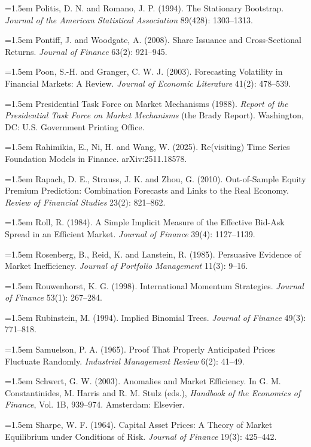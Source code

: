 \hangindent=1.5em Politis, D. N. and Romano, J. P. (1994). The Stationary Bootstrap. \emph{Journal of the American Statistical Association} 89(428): 1303--1313.

\hangindent=1.5em Pontiff, J. and Woodgate, A. (2008). Share Issuance and Cross-Sectional Returns. \emph{Journal of Finance} 63(2): 921--945.

\hangindent=1.5em Poon, S.-H. and Granger, C. W. J. (2003). Forecasting Volatility in Financial Markets: A Review. \emph{Journal of Economic Literature} 41(2): 478--539.

\hangindent=1.5em Presidential Task Force on Market Mechanisms (1988). \emph{Report of the Presidential Task Force on Market Mechanisms} (the Brady Report). Washington, DC: U.S. Government Printing Office.

\hangindent=1.5em Rahimikia, E., Ni, H. and Wang, W. (2025). Re(visiting) Time Series Foundation Models in Finance. arXiv:2511.18578.

\hangindent=1.5em Rapach, D. E., Strauss, J. K. and Zhou, G. (2010). Out-of-Sample Equity Premium Prediction: Combination Forecasts and Links to the Real Economy. \emph{Review of Financial Studies} 23(2): 821--862.

\hangindent=1.5em Roll, R. (1984). A Simple Implicit Measure of the Effective Bid-Ask Spread in an Efficient Market. \emph{Journal of Finance} 39(4): 1127--1139.

\hangindent=1.5em Rosenberg, B., Reid, K. and Lanstein, R. (1985). Persuasive Evidence of Market Inefficiency. \emph{Journal of Portfolio Management} 11(3): 9--16.

\hangindent=1.5em Rouwenhorst, K. G. (1998). International Momentum Strategies. \emph{Journal of Finance} 53(1): 267--284.

\hangindent=1.5em Rubinstein, M. (1994). Implied Binomial Trees. \emph{Journal of Finance} 49(3): 771--818.

\hangindent=1.5em Samuelson, P. A. (1965). Proof That Properly Anticipated Prices Fluctuate Randomly. \emph{Industrial Management Review} 6(2): 41--49.

\hangindent=1.5em Schwert, G. W. (2003). Anomalies and Market Efficiency. In G. M. Constantinides, M. Harris and R. M. Stulz (eds.), \emph{Handbook of the Economics of Finance}, Vol. 1B, 939--974. Amsterdam: Elsevier.

\hangindent=1.5em Sharpe, W. F. (1964). Capital Asset Prices: A Theory of Market Equilibrium under Conditions of Risk. \emph{Journal of Finance} 19(3): 425--442.

